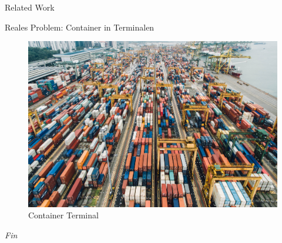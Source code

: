 \documentclass{beamer}
\begin{document}
\begin{frame}{Related Work}
	\begin{pointlist}
		\item Reales Problem: Container in Terminalen
	\end{pointlist}
	\begin{figure}[ht]
		\includegraphics[width=.65\textwidth]{container}
		\caption{Container Terminal}
    \end{figure}
\end{frame}



\begin{frame}{}
  \centering \Huge
  \emph{Fin}
\end{frame}


	
    	
    	
    	
\end{document}

